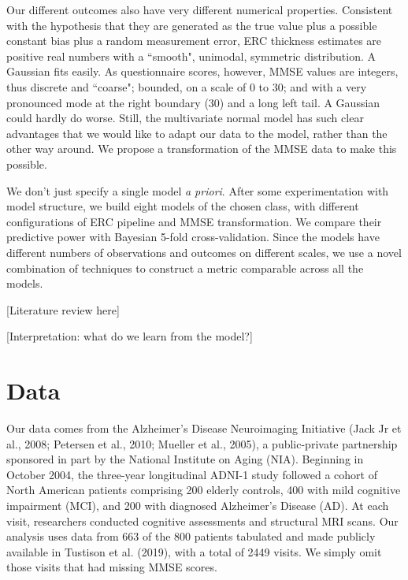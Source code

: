 \documentclass[12pt]{article}
\begin{document}
Our different outcomes also have very different numerical properties. Consistent with the hypothesis that they are generated as the true value plus a possible constant bias plus a random measurement error, ERC thickness estimates are positive real numbers with a ``smooth", unimodal, symmetric distribution. A Gaussian fits easily. As questionnaire scores, however, MMSE values are integers, thus discrete and ``coarse"; bounded, on a scale of 0 to 30; and with a very pronounced mode at the right boundary (30) and a long left tail. A Gaussian could hardly do worse. Still, the multivariate normal model has such clear advantages that we would like to adapt our data to the model, rather than the other way around. We propose a transformation of the MMSE data to make this possible. 

We don't just specify a single model \textit{a priori}. After some experimentation with model structure, we build eight models of the chosen class, with different configurations of ERC pipeline and MMSE transformation. We compare their predictive power with Bayesian 5-fold cross-validation. Since the models have different numbers of observations and outcomes on different scales, we use a novel combination of techniques to construct a metric comparable across all the models. 

{\color{teal} [Literature review here]}

{\color{teal} [Interpretation: what do we learn from the model?]}

\pagebreak
\section{Data}

Our data comes from the Alzheimer's Disease Neuroimaging Initiative (Jack Jr et al., 2008; Petersen et al., 2010; Mueller et al., 2005), a public-private partnership sponsored in part by the National Institute on Aging (NIA). Beginning in October 2004, the three-year longitudinal ADNI-1 study followed a cohort of North American patients comprising 200 elderly controls, 400 with mild cognitive impairment (MCI), and 200 with diagnosed Alzheimer's Disease (AD). At each visit, researchers conducted cognitive assessments and structural MRI scans. Our analysis uses data from 663 of the 800 patients tabulated and made publicly available in Tustison et al. (2019), with a total of 2449 visits. We simply omit those visits that had missing MMSE scores.
\end{document}
